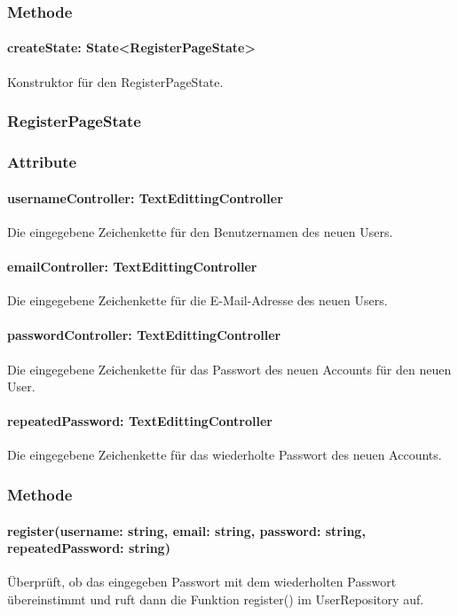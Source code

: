 \documentclass[parskip=full]{scrartcl}
\begin{document}
\subsubsection*{Methode}
\paragraph*{createState: State<RegisterPageState>} Konstruktor für den RegisterPageState.

\subsubsection{RegisterPageState}
\subsubsection*{Attribute}
\paragraph*{usernameController: TextEdittingController} Die eingegebene Zeichenkette für den Benutzernamen des neuen Users.
\paragraph*{emailController: TextEdittingController} Die eingegebene Zeichenkette für die E-Mail-Adresse des neuen Users.
\paragraph*{passwordController: TextEdittingController} Die eingegebene Zeichenkette für das Passwort des neuen Accounts für den neuen User.
\paragraph*{repeatedPassword: TextEdittingController} Die eingegebene Zeichenkette für das wiederholte Passwort des neuen Accounts.

\subsubsection*{Methode}
\paragraph*{register(username: string, email: string, password: string, repeatedPassword: string)} Überprüft, ob das eingegeben Passwort mit dem wiederholten Passwort übereinstimmt und ruft dann die Funktion register() im UserRepository auf.
\end{document}
